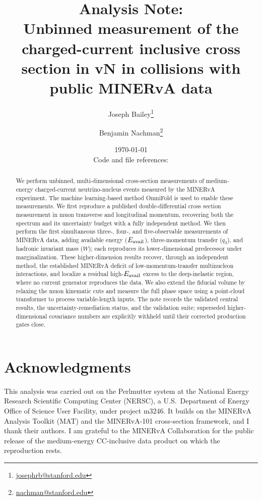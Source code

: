 \documentclass[11pt]{article}
\title{\textbf{Analysis Note:}\\
Unbinned measurement of the charged-current inclusive cross section in vN in collisions with public MINERvA data}
\author[1]{Joseph Bailey\thanks{\url{josephrb@stanford.edu}}}
\author[2]{Benjamin Nachman\thanks{\url{nachman@stanford.edu}}}
\affil[1]{Department of Physics, Stanford University}
\affil[2]{Department of Particle Physics and Astrophysics, Stanford University and SLAC National Laboratory}
\date{\today\\[4pt]\small Code and file references: \repolink}
\begin{document}
\maketitle

\begin{abstract}

We perform unbinned, multi-dimensional cross-section measurements of medium-energy charged-current neutrino-nucleus events measured by the MINERvA experiment.  The machine learning-based method OmniFold is used to enable these measurements.  We first reproduce a published double-differential cross section measurement in muon transverse and longitudinal momentum, recovering both the spectrum and its uncertainty budget with a fully independent method. We then perform the first simultaneous three-, four-, and five-observable measurements of MINERvA data, adding available energy ($E_{\mathrm{avail}}$), three-momentum transfer ($q_{3}$), and hadronic invariant mass ($W$); each reproduces its lower-dimensional predecessor under marginalization. These higher-dimension results recover, through an independent method, the established MINERvA deficit of low-momentum-transfer multinucleon interactions, and localize a residual high-$E_{\mathrm{avail}}$ excess to the deep-inelastic region, where no current generator reproduces the data. We also extend the fiducial volume by relaxing the muon kinematic cuts and measure the full phase space using a point-cloud transformer to process variable-length inputs. The note records the validated central results, the uncertainty-remediation status, and the validation suite; superseded higher-dimensional covariance numbers are explicitly withheld until their corrected production gates close.

\end{abstract}


\clearpage

\tableofcontents













\section*{Acknowledgments}
This
analysis was carried out on the Perlmutter system at the National Energy
Research Scientific Computing Center (NERSC), a U.S.\ Department of Energy
Office of Science User Facility, under project m3246. It builds on the MINERvA
Analysis Toolkit (MAT) and the MINERvA-101 cross-section framework, and I thank
their authors. I am grateful to the MINERvA Collaboration for the public release
of the medium-energy CC-inclusive data product on which the reproduction rests.
\end{document}
